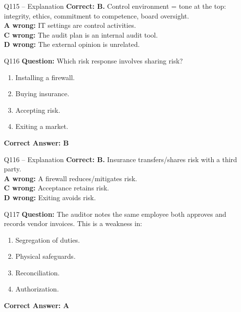 \documentclass[aspectratio=169,10pt]{beamer}
\begin{document}
	\begin{frame}[t]{Q115 -- Explanation}
		\small
		\textbf{Correct: B.} Control environment = tone at the top: integrity, ethics, commitment to competence, board oversight. \\[4pt]
		\textbf{A wrong:} IT settings are control activities. \\[2pt]
		\textbf{C wrong:} The audit plan is an internal audit tool. \\[2pt]
		\textbf{D wrong:} The external opinion is unrelated.
	\end{frame}
	
	\begin{frame}[t]{Q116}
		\small
		\textbf{Question:} Which risk response involves sharing risk?
		\begin{enumerate}[label=\Alph*.,itemsep=1pt,topsep=2pt]
			\item Installing a firewall.
			\item Buying insurance.
			\item Accepting risk.
			\item Exiting a market.
		\end{enumerate}
		\vspace{4pt}
		\textbf{Correct Answer: B}
	\end{frame}
	
	\begin{frame}[t]{Q116 -- Explanation}
		\small
		\textbf{Correct: B.} Insurance transfers/shares risk with a third party. \\[4pt]
		\textbf{A wrong:} A firewall reduces/mitigates risk. \\[2pt]
		\textbf{C wrong:} Acceptance retains risk. \\[2pt]
		\textbf{D wrong:} Exiting avoids risk.
	\end{frame}
	
	\begin{frame}[t]{Q117}
		\small
		\textbf{Question:} The auditor notes the same employee both approves and records vendor invoices. This is a weakness in:
		\begin{enumerate}[label=\Alph*.,itemsep=1pt,topsep=2pt]
			\item Segregation of duties.
			\item Physical safeguards.
			\item Reconciliation.
			\item Authorization.
		\end{enumerate}
		\vspace{4pt}
		\textbf{Correct Answer: A}
	\end{frame}
	
\end{document}
